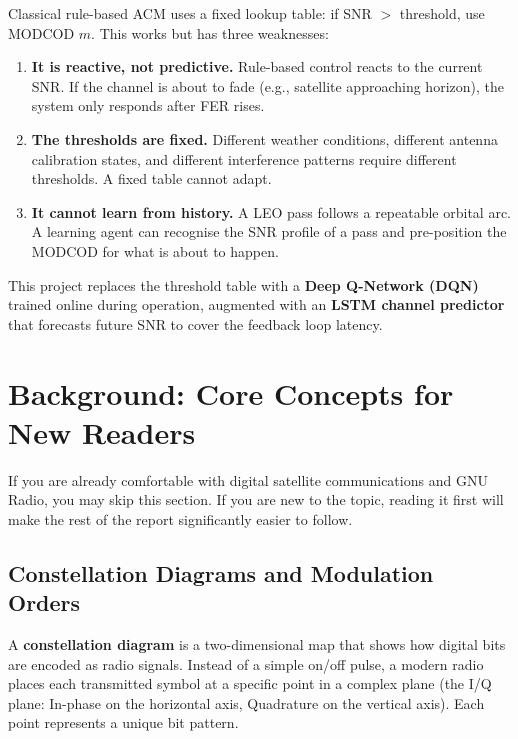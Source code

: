 \documentclass[12pt,a4paper]{report}
\begin{document}
Classical rule-based ACM uses a fixed lookup table: if SNR $>$ threshold, use
MODCOD $m$. This works but has three weaknesses:

\begin{enumerate}
    \item \textbf{It is reactive, not predictive.} Rule-based control reacts to
          the current SNR. If the channel is about to fade (e.g., satellite
          approaching horizon), the system only responds after FER rises.
    \item \textbf{The thresholds are fixed.} Different weather conditions,
          different antenna calibration states, and different interference
          patterns require different thresholds. A fixed table cannot adapt.
    \item \textbf{It cannot learn from history.} A LEO pass follows a
          repeatable orbital arc. A learning agent can recognise the SNR
          profile of a pass and pre-position the MODCOD for what is about
          to happen.
\end{enumerate}

This project replaces the threshold table with a \textbf{Deep Q-Network (DQN)}~\cite{mnih2015}
trained online during operation, augmented with an \textbf{LSTM channel
predictor}~\cite{zhang2022} that forecasts future SNR to cover the feedback loop latency.

\section{Background: Core Concepts for New Readers}
\label{sec:background}

\begin{importantnote}
If you are already comfortable with digital satellite communications and GNU Radio,
you may skip this section.  If you are new to the topic, reading it first will
make the rest of the report significantly easier to follow.
\end{importantnote}

\subsection*{Constellation Diagrams and Modulation Orders}

A \textbf{constellation diagram} is a two-dimensional map that shows how digital
bits are encoded as radio signals.  Instead of a simple on/off pulse, a modern
radio places each transmitted symbol at a specific point in a complex plane (the
I/Q plane: In-phase on the horizontal axis, Quadrature on the vertical axis).
Each point represents a unique bit pattern.
\end{document}
